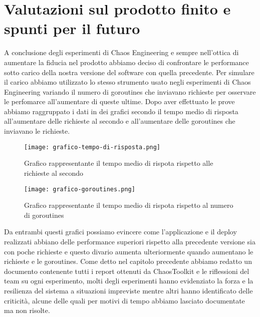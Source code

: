 \section{Valutazioni sul prodotto finito e spunti per il futuro}
A conclusione degli esperimenti di Chaos Engineering e sempre nell'ottica di aumentare la fiducia nel prodotto abbiamo deciso di confrontare le performance sotto carico della nostra versione del software con quella precedente.
Per simulare il carico abbiamo utilizzato lo stesso strumento usato negli esperimenti di Chaos Engineering variando il numero di goroutines che inviavano richieste per osservare le perfomarce all'aumentare di queste ultime.
Dopo aver effettuato le prove abbiamo raggruppato i dati in dei grafici secondo il tempo medio di risposta all'aumentare delle richieste al secondo e all'aumentare delle goroutines che inviavano le richieste.
\begin{figure}[h]
    \centering
    \texttt{[image: grafico-tempo-di-risposta.png]}
    \caption{Grafico rappresentante il tempo medio di rispota rispetto alle richieste al secondo}
    \label{tab:graph-req-sec}
\end{figure}
\begin{figure}[h]
    \centering
    \texttt{[image: grafico-goroutines.png]}
    \caption{Grafico rappresentante il tempo medio di rispota rispetto al numero di goroutines}
    \label{tab:graph-goroutines}
\end{figure}

Da entrambi questi grafici possiamo evincere come l'applicazione e il deploy realizzati abbiano delle performance superiori rispetto alla precedente versione sia con poche richieste e questo divario aumenta ulteriormente quando aumentano le richieste e le goroutines.
Come detto nel capitolo precedente abbiamo redatto un documento contenente tutti i report ottenuti da ChaosToolkit e le riflessioni del team su ogni esperimento, molti degli esperimenti hanno evidenziato la forza e la resilienza del sistema a situazioni impreviste mentre altri hanno identificato delle criticità, alcune delle quali per motivi di tempo abbiamo lasciato documentate ma non risolte.